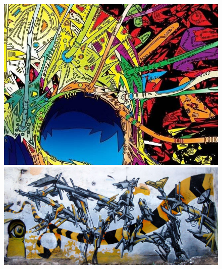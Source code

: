 \documentclass[17pt]{extarticle}
\begin{document}
\begin{figure}
\begin{minipage}{.5\textwidth}
  	\includegraphics[scale=0.55]{acidcrop.png}
  	\includegraphics[scale=0.24]{graffiti.jpg}
\end{minipage}
\end{figure}
\end{document}
